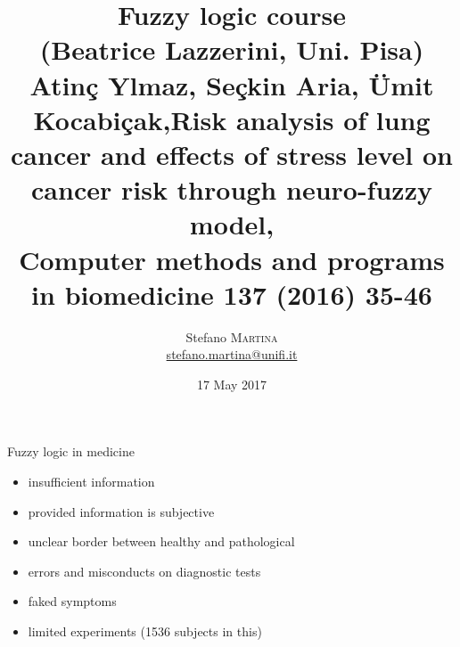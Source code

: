 





\title[]{\textbf{Fuzzy logic course}\\ \tiny{(Beatrice Lazzerini, Uni. Pisa)}\\
  \tiny{Atin\c{c} Ylmaz,
    Se\c{c}kin Aria, \"{U}mit Kocabi\c{c}ak,}\small{\textbf{Risk analysis of lung
    cancer and effects of stress 
    level on cancer risk through neuro-fuzzy model},}\\
  \tiny{Computer methods and programs in biomedicine 137 (2016) 35-46}}
\date[17 May 2017]{17 May 2017}

\author[Martina Stefano]{
  \begin{center}
    \begin{tabular}{lr}
      Stefano \textsc{Martina}\\
      \href{mailto:stefano.martina@unifi.it}{stefano.martina@unifi.it}\\
    \end{tabular}
  \end{center}
}



\begin{frame}[plain]
  \titlepage
\end{frame}

\begin{frame}{Fuzzy logic in medicine}
  \begin{itemize}
  \item \alert{insufficient} information\pause
  \item provided information is \alert{subjective}\pause
  \item unclear \alert{border} between healthy and pathological\pause
  \item \alert{errors} and misconducts on diagnostic tests\pause
  \item \alert{faked} symptoms\pause
  \item \alert{limited} experiments (1536 subjects in this)
  \end{itemize}
\end{frame}

